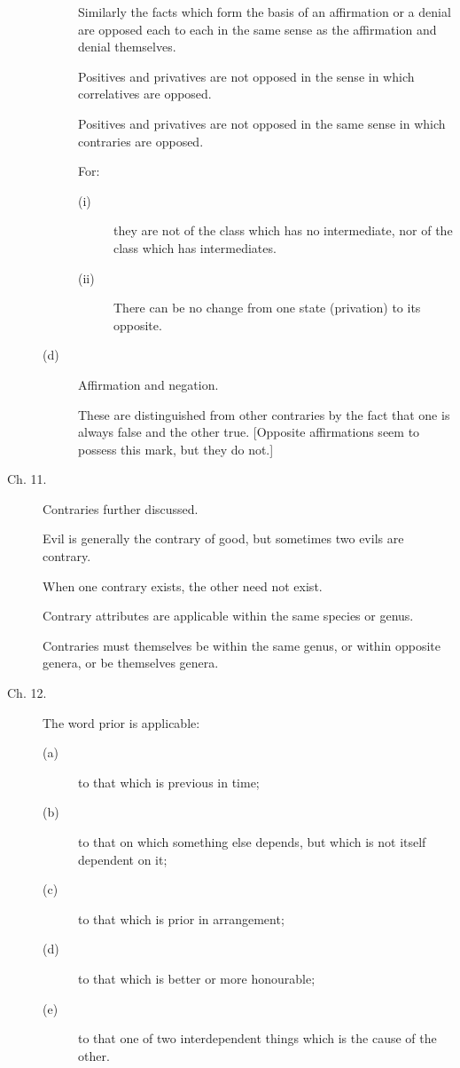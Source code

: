 \begin{description}
\begin{description}
Similarly the facts which form the basis of an affirmation or a denial 
are opposed each to each in the same sense as the affirmation and 
denial themselves. 

Positives and privatives are not opposed in the sense in which 
correlatives are opposed. 

Positives and privatives are not opposed in the same sense in which 
contraries are opposed. 

For:
\begin{description}
\item[(i)] they are not of the class which has no intermediate, nor of 
the class which has intermediates. 
\item[(ii)] There can be no change from one state (privation) to its 
opposite.
\end{description}
\item[(d)] Affirmation and negation.

These are distinguished from other 
contraries by the fact that one is always false and the other 
true.
[Opposite affirmations seem to possess this mark, but they do not.] 
\end{description}

\item[Ch. 11.] Contraries further discussed. 

Evil is generally the contrary of good, but sometimes two evils are contrary. 

When one contrary exists, the other need not exist. 

Contrary attributes are applicable within the same species or genus. 

Contraries must themselves be within the same genus, or within 
opposite genera, or be themselves genera. 

\item[Ch. 12.] The word prior is applicable: 
\begin{description}
\item[(a)] to that which is previous in time; 
\item[(b)] to that on which something else depends, but which is not itself dependent on it;
\item[(c)] to that which is prior in arrangement; 
\item[(d)] to that which is better or more honourable; 
\item[(e)] to that one of two interdependent things which is the cause of the other. 
\end{description}


\end{description}
